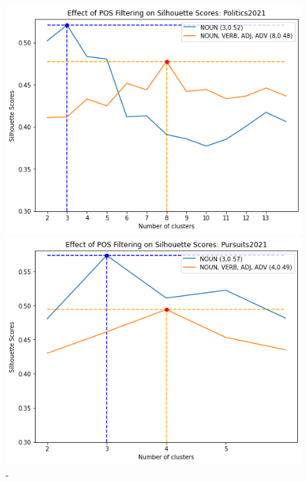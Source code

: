 \begin{figure}[H]
\begin{minipage}[t]{.49\textwidth}
    \includegraphics[width=\linewidth]{images/eval/politics2021_sil.png}
    \caption{-}
    \label{fig:pos_politics2021}
  \end{minipage}
  \begin{minipage}[t]{.49\textwidth}
    \centering
    \includegraphics[width=\linewidth]{images/eval/pursuits2021_sil.png}
    \caption{-}
    \label{fig:pos_pursuit2021}
  \end{minipage}
\end{figure}

